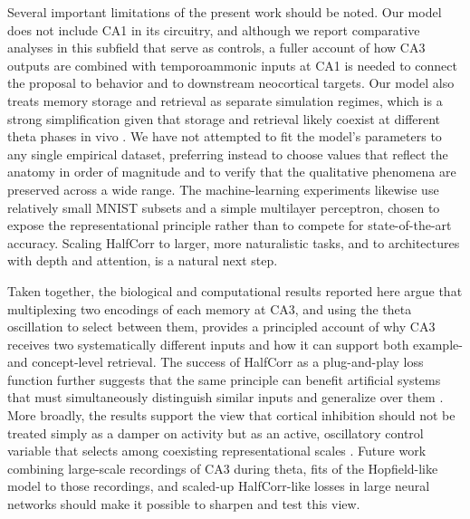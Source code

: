 \documentclass[11pt]{article}
\begin{document}
Several important limitations of the present work should be noted. Our
model does not include CA1 in its circuitry, and although we report
comparative analyses in this subfield that serve as controls, a fuller
account of how CA3 outputs are combined with temporoammonic inputs at
CA1 is needed to connect the proposal to behavior and to downstream
neocortical targets. Our model also treats memory storage and retrieval
as separate simulation regimes, which is a strong simplification given
that storage and retrieval likely coexist at different theta phases in
vivo \cite{tsodyks1996population}. We have not attempted to fit the
model's parameters to any single empirical dataset, preferring instead to
choose values that reflect the anatomy in order of magnitude and to
verify that the qualitative phenomena are preserved across a wide range.
The machine-learning experiments likewise use relatively small MNIST
subsets and a simple multilayer perceptron, chosen to expose the
representational principle rather than to compete for state-of-the-art
accuracy. Scaling HalfCorr to larger, more naturalistic tasks, and to
architectures with depth and attention, is a natural next step.

Taken together, the biological and computational results reported here
argue that multiplexing two encodings of each memory at CA3, and using the
theta oscillation to select between them, provides a principled account of
why CA3 receives two systematically different inputs and how it can
support both example- and concept-level retrieval. The success of HalfCorr
as a plug-and-play loss function further suggests that the same principle
can benefit artificial systems that must simultaneously distinguish similar
inputs and generalize over them \cite{quiroga2005invariant,lecun2015deep}.
More broadly, the results support the view that cortical inhibition should
not be treated simply as a damper on activity but as an active, oscillatory
control variable that selects among coexisting representational scales
\cite{isaacson2011inhibition}. Future work combining large-scale recordings
of CA3 during theta, fits of the Hopfield-like model to those recordings,
and scaled-up HalfCorr-like losses in large neural networks should make
it possible to sharpen and test this view.


\end{document}
